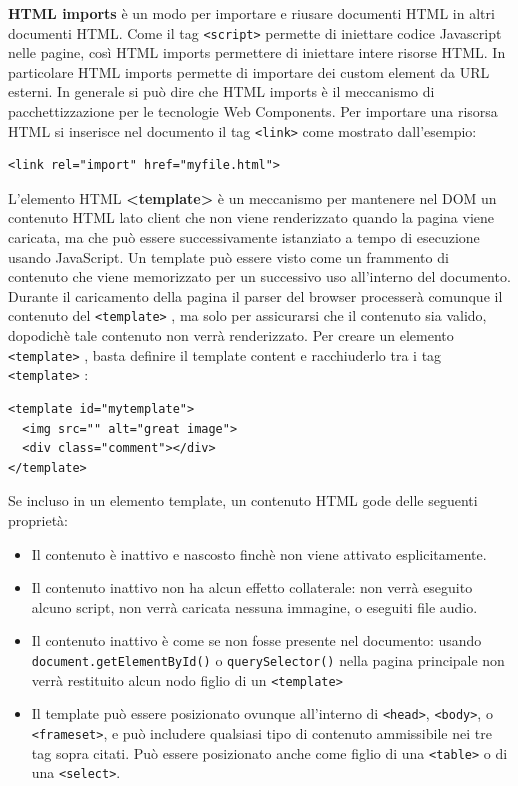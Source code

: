 \textbf{HTML imports} è un modo per importare e riusare documenti HTML in altri documenti HTML. Come il tag \texttt{<script>} permette di iniettare codice Javascript nelle pagine, così HTML imports permettere di iniettare intere risorse HTML. In particolare HTML imports permette di importare dei custom element da URL esterni. In generale si può dire che HTML imports è il meccanismo di pacchettizzazione per le tecnologie Web Components.
Per importare una risorsa HTML si inserisce nel documento il tag \texttt{<link>} come mostrato dall’esempio:
\begin{lstlisting}[language=HTML5]
<link rel="import" href="myfile.html">
\end{lstlisting}

L’elemento HTML \textbf{<template>} è un meccanismo per mantenere nel DOM un contenuto HTML lato client che non viene renderizzato quando la pagina viene caricata, ma che può essere successivamente istanziato a tempo di esecuzione usando JavaScript. Un template può essere visto come un frammento di contenuto che viene memorizzato per un successivo uso all’interno del documento. Durante il caricamento della pagina il parser del browser processerà comunque il contenuto del \texttt{<template>} , ma solo per assicurarsi che il contenuto sia valido, dopodichè tale contenuto non verrà renderizzato.
Per creare un elemento \texttt{<template>} , basta definire il template content e racchiuderlo tra i tag \texttt{<template>} :
\begin{lstlisting}[language=HTML5]
<template id="mytemplate">
  <img src="" alt="great image">
  <div class="comment"></div>
</template>
\end{lstlisting}
Se incluso in un elemento template, un contenuto HTML gode delle seguenti proprietà: 
\begin{itemize}
\item Il contenuto è inattivo e nascosto finchè non viene attivato esplicitamente.
\item Il contenuto inattivo non ha alcun effetto collaterale: non verrà eseguito alcuno script, non verrà caricata nessuna immagine, o eseguiti file audio.
\item Il contenuto inattivo è come se non fosse presente nel documento: usando \texttt{document.getElementById()} o \texttt{querySelector()} nella pagina principale non verrà restituito alcun nodo figlio di un \texttt{<template>}
\item Il template può essere posizionato ovunque all’interno di \texttt{<head>}, \texttt{<body>}, o \texttt{<frameset>}, e può includere qualsiasi tipo di contenuto ammissibile nei tre tag sopra citati. Può essere posizionato anche come figlio di una \texttt{<table>} o di una \texttt{<select>}. 
\end{itemize}
